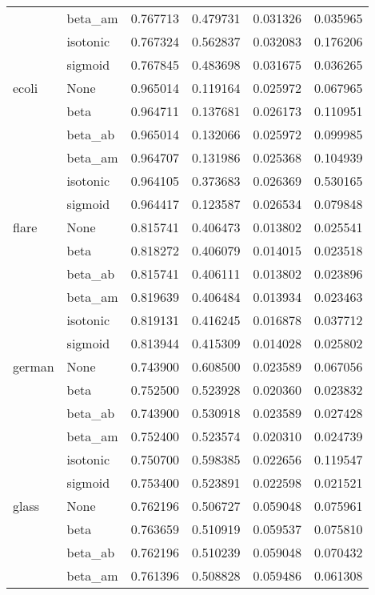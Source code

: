 \begin{tabular}{llrrrr}
        & beta\_am &  0.767713 &  0.479731 &  0.031326 &  0.035965 \\
        & isotonic &  0.767324 &  0.562837 &  0.032083 &  0.176206 \\
        & sigmoid &  0.767845 &  0.483698 &  0.031675 &  0.036265 \\
ecoli & None &  0.965014 &  0.119164 &  0.025972 &  0.067965 \\
        & beta &  0.964711 &  0.137681 &  0.026173 &  0.110951 \\
        & beta\_ab &  0.965014 &  0.132066 &  0.025972 &  0.099985 \\
        & beta\_am &  0.964707 &  0.131986 &  0.025368 &  0.104939 \\
        & isotonic &  0.964105 &  0.373683 &  0.026369 &  0.530165 \\
        & sigmoid &  0.964417 &  0.123587 &  0.026534 &  0.079848 \\
flare & None &  0.815741 &  0.406473 &  0.013802 &  0.025541 \\
        & beta &  0.818272 &  0.406079 &  0.014015 &  0.023518 \\
        & beta\_ab &  0.815741 &  0.406111 &  0.013802 &  0.023896 \\
        & beta\_am &  0.819639 &  0.406484 &  0.013934 &  0.023463 \\
        & isotonic &  0.819131 &  0.416245 &  0.016878 &  0.037712 \\
        & sigmoid &  0.813944 &  0.415309 &  0.014028 &  0.025802 \\
german & None &  0.743900 &  0.608500 &  0.023589 &  0.067056 \\
        & beta &  0.752500 &  0.523928 &  0.020360 &  0.023832 \\
        & beta\_ab &  0.743900 &  0.530918 &  0.023589 &  0.027428 \\
        & beta\_am &  0.752400 &  0.523574 &  0.020310 &  0.024739 \\
        & isotonic &  0.750700 &  0.598385 &  0.022656 &  0.119547 \\
        & sigmoid &  0.753400 &  0.523891 &  0.022598 &  0.021521 \\
glass & None &  0.762196 &  0.506727 &  0.059048 &  0.075961 \\
        & beta &  0.763659 &  0.510919 &  0.059537 &  0.075810 \\
        & beta\_ab &  0.762196 &  0.510239 &  0.059048 &  0.070432 \\
        & beta\_am &  0.761396 &  0.508828 &  0.059486 &  0.061308 \\

\end{tabular}
